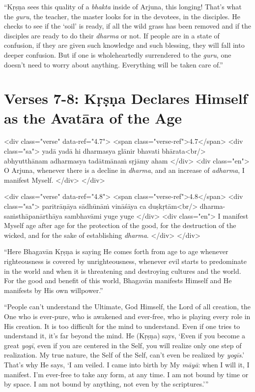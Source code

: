 \enquote{Kṛṣṇa sees this quality of a \textit{bhakta} inside of Arjuna, this longing! That’s what the \textit{guru}, the teacher, the master looks for in the devotees, in the disciples. He checks to see if the \enquote{soil} is ready, if all the wild grass has been removed and if the disciples are ready to do their \textit{dharma} or not. If people are in a state of confusion, if they are given such knowledge and such blessing, they will fall into deeper confusion. But if one is wholeheartedly surrendered to the \textit{guru}, one doesn’t need to worry about anything. Everything will be taken care of.}

\section{Verses 7-8: Kṛṣṇa Declares Himself as the Avatāra of the Age}\label{sec-verses-7-8-krsna-declares-himself-as-the-avatara-of-the-age}


\begin{html}
<div class="verse" data-ref="4.7">
  <span class="verse-ref">4.7</span>
  <div class="sa">
    yadā yadā hi dharmasya glānir bhavati bhārata<br/>
    abhyutthānam adharmasya tadātmānaṁ sṛjāmy aham
  </div>
  <div class="en">
    O Arjuna, whenever there is a decline in \textit{dharma}, and an increase of \textit{adharma}, I manifest Myself.
  </div>
</div>
\end{html}



\begin{html}
<div class="verse" data-ref="4.8">
  <span class="verse-ref">4.8</span>
  <div class="sa">
    paritrāṇāya sādhūnāṁ vināśāya ca duṣkṛtām<br/>
    dharma-saṁsthāpanārthāya sambhavāmi yuge yuge
  </div>
  <div class="en">
    I manifest Myself age after age for the protection of the good, for the destruction of the wicked, and for the sake of establishing \textit{dharma}.
  </div>
</div>
\end{html}


\enquote{Here Bhagavān Kṛṣṇa is saying He comes forth from age to age whenever righteousness is covered by unrighteousness, whenever evil starts to predominate in the world and when it is threatening and destroying cultures and the world. For the good and benefit of this world, Bhagavān manifests Himself and He manifests by His own willpower.}

\enquote{People can’t understand the Ultimate, God Himself, the Lord of all creation, the One who is ever-pure, who is awakened and ever-free, who is playing every role in His creation. It is too difficult for the mind to understand. Even if one tries to understand it, it’s far beyond the mind. He (Kṛṣṇa) says, \enquote{Even if you become a great \textit{yogī}, even if you are centered in the Self, you will realize only one step of realization. My true nature, the Self of the Self, can’t even be realized by \textit{yogīs}.} That’s why He says, \enquote{I am veiled. I came into birth by My \textit{māyā}: when I will it, I manifest. I’m ever-free to take any form, at any time. I am not bound by time or by space. I am not bound by anything, not even by the scriptures.}}

